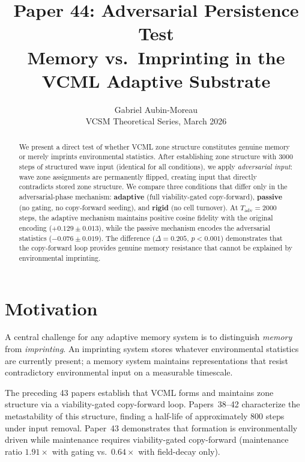 \documentclass[11pt]{article}
\title{\textbf{Paper 44: Adversarial Persistence Test}\\[0.4em]
\large Memory vs.\ Imprinting in the VCML Adaptive Substrate}
\author{Gabriel Aubin-Moreau\\
\small VCSM Theoretical Series, March 2026}
\date{}
\begin{document}
\maketitle

\begin{abstract}
We present a direct test of whether VCML zone structure constitutes genuine memory
or merely imprints environmental statistics.
After establishing zone structure with 3000 steps of structured wave input
(identical for all conditions), we apply \emph{adversarial input}: wave zone
assignments are permanently flipped, creating input that directly contradicts stored
zone structure.
We compare three conditions that differ only in the adversarial-phase mechanism:
\textbf{adaptive} (full viability-gated copy-forward),
\textbf{passive} (no gating, no copy-forward seeding),
and \textbf{rigid} (no cell turnover).
At $T_\mathrm{adv}=2000$ steps, the adaptive mechanism maintains
positive cosine fidelity with the original encoding ($+0.129 \pm 0.013$), while
the passive mechanism encodes the adversarial statistics ($-0.076 \pm 0.019$).
The difference ($\Delta = 0.205$, $p < 0.001$) demonstrates that the copy-forward
loop provides genuine memory resistance that cannot be explained by environmental
imprinting.
\end{abstract}

\section{Motivation}

A central challenge for any adaptive memory system is to distinguish
\emph{memory} from \emph{imprinting}.
An imprinting system stores whatever environmental statistics are currently present;
a memory system maintains representations that resist contradictory environmental input
on a measurable timescale.

The preceding 43 papers establish that VCML forms and maintains zone structure via
a viability-gated copy-forward loop.
Papers~38--42 characterize the metastability of this structure, finding a half-life
of approximately 800 steps under input removal.
Paper~43 demonstrates that formation is environmentally driven while maintenance requires
viability-gated copy-forward (maintenance ratio $1.91\times$ with gating vs.\ $0.64\times$
with field-decay only).
\end{document}
